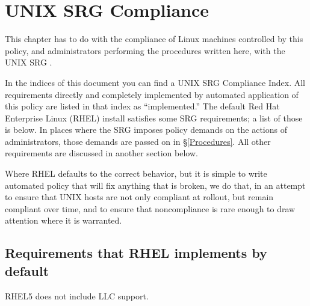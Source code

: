 %
%
%

\chapter{UNIX SRG Compliance}
\label{UNIXSRGCompliance}

This chapter has to do with the compliance of Linux machines controlled by
this policy, and administrators performing the procedures written here,
with the UNIX SRG \cite{unix-srg}.

In the indices of this document you can find a UNIX SRG Compliance Index.
All requirements directly and completely implemented by automated
application of this policy are listed in that index as ``implemented.''
The default Red Hat Enterprise Linux (RHEL) install satisfies some SRG
requirements; a list of those is below. In places where the SRG imposes
policy demands on the actions of administrators, those demands are passed
on in \S\ref{Procedures}. All other requirements are discussed in another
section below.

Where RHEL defaults to the correct behavior, but it is simple to write
automated policy that will fix anything that is broken, we do that, in an
attempt to ensure that UNIX hosts are not only compliant at rollout, but
remain compliant over time, and to ensure that noncompliance is rare
enough to draw attention where it is warranted.






\section{Requirements that RHEL implements by default}

 RHEL5 does not include LLC
support.

